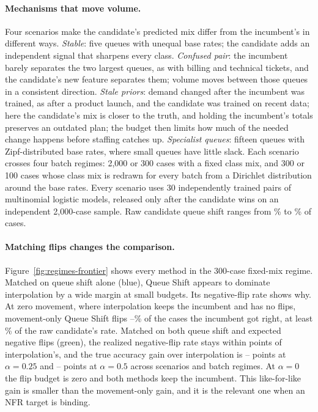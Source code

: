 \documentclass[11pt]{article}
\begin{document}
\paragraph{Mechanisms that move volume.}
Four scenarios make the candidate's predicted mix differ from the incumbent's in different ways.
\emph{Stable}: five queues with unequal base rates; the candidate adds an independent signal that
sharpens every class. \emph{Confused pair}: the incumbent barely separates the two largest queues,
as with billing and technical tickets, and the candidate's new feature separates them; volume moves
between those queues in a consistent direction. \emph{Stale priors}: demand changed after the
incumbent was trained, as after a product launch, and the candidate was trained on recent data;
here the candidate's mix is closer to the truth, and holding the incumbent's totals preserves an
outdated plan; the budget then limits how much of the needed change happens before staffing
catches up. \emph{Specialist
queues}: fifteen queues with Zipf-distributed base rates, where small queues have little slack.
Each scenario crosses four batch regimes: 2,000 or 300 cases with a fixed class mix, and 300 or 100
cases whose class mix is redrawn for every batch from a Dirichlet distribution around the base
rates. Every scenario uses 30 independently trained pairs of multinomial logistic models, released
only after the candidate wins on an independent 2,000-case sample. Raw candidate queue shift ranges
from \RegimeRawShiftMin\% to \RegimeRawShiftMax\% of cases.

\paragraph{Matching flips changes the comparison.}
Figure~\ref{fig:regimes-frontier} shows every method in the 300-case fixed-mix regime. Matched on
queue shift alone (blue), Queue Shift appears to dominate interpolation by a wide margin at small
budgets. Its negative-flip rate shows why. At zero movement, where interpolation keeps the
incumbent and has no flips, movement-only Queue Shift flips \QSZeroNFRMin--\QSZeroNFRMax\% of the
cases the incumbent got right, at least \QSZeroNFRRawShareMin\% of the raw candidate's rate. Matched
on both queue shift and expected negative flips (green), the realized negative-flip rate stays
within \JointNFRGapMax{} points of interpolation's, and the true accuracy gain over interpolation is
\JointQuarterGainMin--\JointQuarterGainMax{} points at $\alpha=0.25$ and
\JointHalfGainMin--\JointHalfGainMax{} points at $\alpha=0.5$ across scenarios and batch regimes. At
$\alpha=0$ the flip budget is zero and both methods keep the incumbent. This like-for-like gain is
smaller than the movement-only gain, and it is the relevant one when an NFR target is binding.
\end{document}
